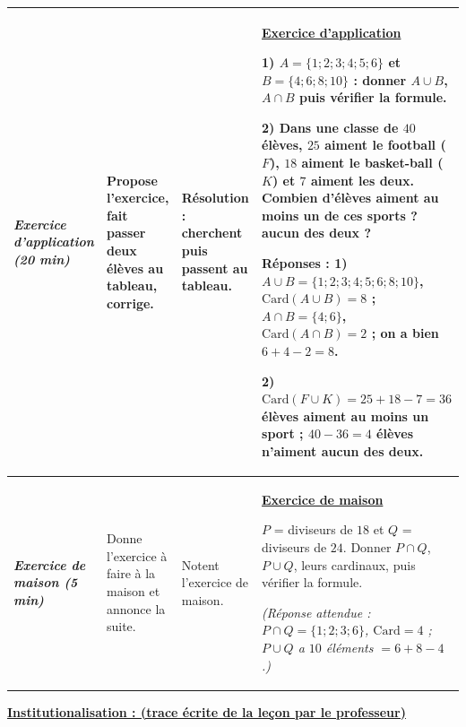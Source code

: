 \documentclass[10pt]{article}
\newcommand{\titreR}[1]{\underline{\textcolor{rougetitre}{\bfseries #1}}}
\newcommand{\app}{\titreR{Exercice d'application}}
\newcommand{\maison}{\underline{\textcolor{rougemaison}{\bfseries Exercice de maison}}}
\newcommand{\moment}[1]{\textbf{\itshape #1}}
\begin{document}
\begin{longtable}{|p{2.35cm}|p{5.35cm}|p{4.55cm}|p{13.85cm}|}
\moment{Exercice d'application (20 min)} &
Propose l'exercice, fait passer deux élèves au tableau, corrige. &
\textbf{Résolution} : cherchent puis passent au tableau. &
\app \par
\textbf{1)} $A=\{1;2;3;4;5;6\}$ et $B=\{4;6;8;10\}$ : donner $A\cup B$, $A\cap B$ puis
vérifier la formule. \par
\textbf{2)} Dans une classe de $40$ élèves, $25$ aiment le football ($F$), $18$ aiment
le basket-ball ($K$) et $7$ aiment les deux. Combien d'élèves aiment au moins un de ces
sports ? aucun des deux ? \par
\textbf{Réponses :} \textbf{1)} $A\cup B=\{1;2;3;4;5;6;8;10\}$,
$\mathrm{Card}(A\cup B)=8$ ; $A\cap B=\{4;6\}$, $\mathrm{Card}(A\cap B)=2$ ; on a bien
$6+4-2=8$. \par
\textbf{2)} $\mathrm{Card}(F\cup K)=25+18-7=36$ élèves aiment au moins un sport ;
$40-36=4$ élèves n'aiment aucun des deux. \\ \hline

\moment{Exercice de maison (5 min)} &
Donne l'exercice à faire à la maison et annonce la suite. &
Notent l'exercice de maison. &
\maison \par
$P$ = diviseurs de $18$ et $Q$ = diviseurs de $24$. Donner $P\cap Q$, $P\cup Q$,
leurs cardinaux, puis vérifier la formule. \par
\textit{(Réponse attendue : $P\cap Q=\{1;2;3;6\}$, $\mathrm{Card}=4$ ;
$P\cup Q$ a $10$ éléments $=6+8-4$.)} \\ \hline
\end{longtable}

\begin{center}
\underline{\textcolor{rougetitre}{\large\bfseries Institutionalisation \; : \; (trace écrite de la leçon par le professeur)}}
\end{center}
\end{document}

